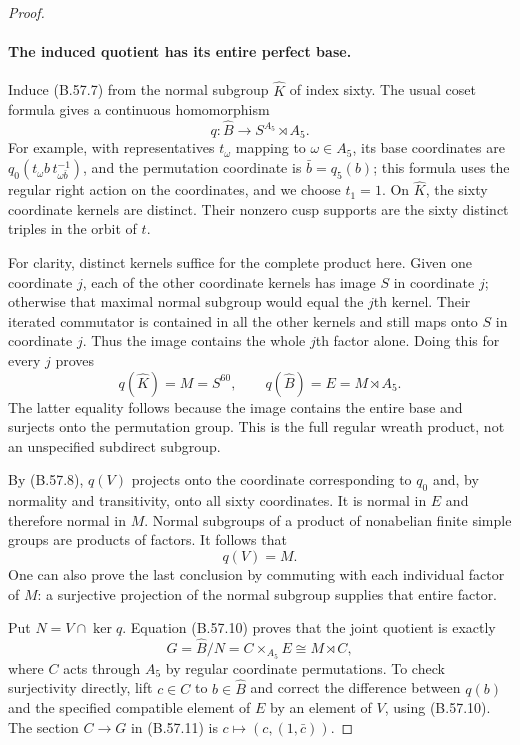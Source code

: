 \begin{proof}
\paragraph{The induced quotient has its entire perfect base.}
Induce (B.57.7) from the normal subgroup $\widehat K$
of index sixty. The usual coset formula gives a
continuous homomorphism
\[
 q:\widehat B\longrightarrow S^{A_5}\rtimes A_5.
\]
For example, with representatives $t_\omega$ mapping
to $\omega\in A_5$, its base coordinates are
$q_0(t_\omega b\,t_{\omega\bar b}^{-1})$, and the
permutation coordinate is $\bar b=q_5(b)$; this formula
uses the regular right action on the coordinates, and
we choose $t_1=1$.
On $\widehat K$, the sixty coordinate kernels are
distinct. Their nonzero cusp supports are the sixty
distinct triples in the orbit of $t$.

For clarity, distinct kernels suffice for the complete
product here. Given one coordinate $j$, each of the
other coordinate kernels has image $S$ in coordinate
$j$; otherwise that maximal normal subgroup would
equal the $j$th kernel. Their iterated commutator is
contained in all the other kernels and still maps
onto $S$ in coordinate $j$. Thus the image contains
the whole $j$th factor alone. Doing this for every
$j$ proves
\[
 q(\widehat K)=M=S^{60},\qquad
 q(\widehat B)=E=M\rtimes A_5.                             \tag{B.57.9}
\]
The latter equality follows because the image contains
the entire base and surjects onto the permutation group.
This is the full regular wreath product, not an
unspecified subdirect subgroup.

By (B.57.8), $q(V)$ projects onto the coordinate
corresponding to $q_0$ and, by normality and transitivity,
onto all sixty coordinates. It is normal in $E$ and
therefore normal in $M$. Normal subgroups of a product
of nonabelian finite simple groups are products of
factors. It follows that
\[
                               q(V)=M.                   \tag{B.57.10}
\]
One can also prove the last conclusion by commuting
with each individual factor of $M$: a surjective
projection of the normal subgroup supplies that
entire factor.

Put $N=V\cap\ker q$. Equation (B.57.10) proves that
the joint quotient is exactly
\[
 G=\widehat B/N
       =C\times_{A_5}E
       \cong M\rtimes C,                                  \tag{B.57.11}
\]
where $C$ acts through $A_5$ by regular coordinate
permutations. To check surjectivity directly, lift
$c\in C$ to $b\in\widehat B$ and correct the difference
between $q(b)$ and the specified compatible element
of $E$ by an element of $V$, using (B.57.10).
The section $C\to G$ in (B.57.11) is
$c\mapsto(c,(1,\bar c))$.


\end{proof}

